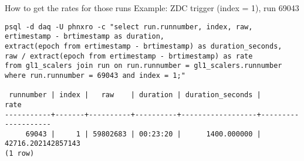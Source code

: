 \documentclass[aspectratio=169,compress,10pt]{beamer}
\begin{document}
\begin{frame}[fragile]{How to get the rates for those runs}
Example: ZDC trigger (index = 1), run 69043
\begin{verbatim}
psql -d daq -U phnxro -c "select run.runnumber, index, raw,
ertimestamp - brtimestamp as duration,
extract(epoch from ertimestamp - brtimestamp) as duration_seconds,
raw / extract(epoch from ertimestamp - brtimestamp) as rate
from gl1_scalers join run on run.runnumber = gl1_scalers.runnumber
where run.runnumber = 69043 and index = 1;"

 runnumber | index |   raw    | duration | duration_seconds |        rate        
-----------+-------+----------+----------+------------------+--------------------
     69043 |     1 | 59802683 | 00:23:20 |      1400.000000 | 42716.202142857143
(1 row)

\end{verbatim}
\end{frame}
\end{document}
